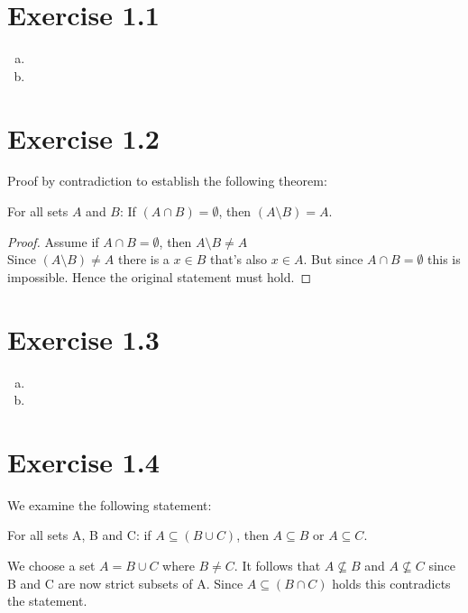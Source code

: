 \documentclass{article} %
\newcommand{\homeworkNumber}{1}
\begin{document}
\section*{Exercise \homeworkNumber.1}

\begin{enumerate}[(a)]
	\item
	\item
\end{enumerate}



\section*{Exercise \homeworkNumber.2}
    Proof by contradiction to establish the following theorem:
    \begin{center}
        For all sets $A$ and $B$: If $(A \cap B) = \emptyset$, then $(A \setminus B) = A$.
    \end{center}
    \begin{proof}
        Assume if $A \cap B = \emptyset$, then $A\setminus B \neq A$ \\
        Since $(A \setminus B) \neq A$ there is a $x \in B$ that's also $x \in A$. But since $A \cap B = \emptyset$ this is impossible. Hence the original statement must hold.
    \end{proof}



\section*{Exercise \homeworkNumber.3}

\begin{enumerate}[(a)]
	\item
	\item
\end{enumerate}



\section*{Exercise \homeworkNumber.4}
    We examine the following statement:
    \begin{center}
        For all sets A, B and C: if $A \subseteq (B \cup C)$, then $A \subseteq B$ or $A \subseteq C$.
    \end{center}
        We choose a set $A = B \cup C$ where $B \neq C$. It follows that $A \not\subseteq B$ and $A \not\subseteq C$ since B and C are now strict subsets of A. Since $A \subseteq (B \cap C)$ holds this contradicts the statement.
\end{document}
